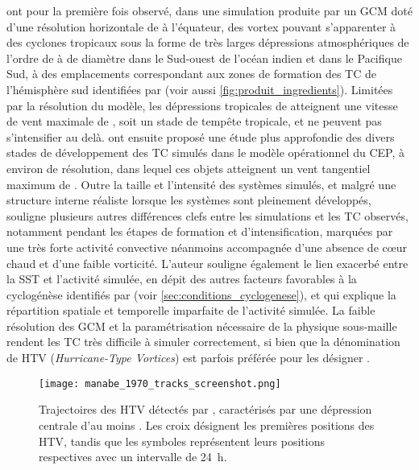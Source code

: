 \documentclass[../main.tex]{subfiles}
\begin{document}
\cite{manabe_tropical_1970} ont pour la première fois observé, dans une simulation produite par un GCM doté d'une résolution horizontale de  à
l'équateur, des vortex pouvant s'apparenter à des cyclones tropicaux sous la forme de très larges dépressions atmosphériques de l'ordre de  à 
de diamètre dans le Sud-ouest de l'océan indien et dans le Pacifique Sud, à des emplacements correspondant aux zones de formation des TC de l'hémisphère sud
identifiées par \cite{gray_global_1968} (voir aussi \cref{fig:produit_ingredients}). Limitées par la résolution du modèle, les dépressions tropicales de
\cite{manabe_tropical_1970} atteignent une vitesse de vent maximale de , soit un stade de tempête tropicale, et ne peuvent pas s'intensifier au delà.
\cite{bengtsson_simulation_1982} ont ensuite proposé une étude plus approfondie des divers stades de développement des TC simulés dans le modèle opérationnel du
CEP, à environ  de résolution, dans lequel ces objets atteignent un vent tangentiel maximum de . Outre la taille et l'intensité des systèmes
simulés, et malgré une structure interne réaliste lorsque les systèmes sont pleinement développés, \cite{mcbride_comments_1984} souligne plusieurs autres
différences clefs entre les simulations et les TC observés, notamment pendant les étapes de formation et d'intensification, marquées par une très forte activité
convective néanmoins accompagnée d'une absence de cœur chaud et d'une faible vorticité. L'auteur souligne également le lien exacerbé entre la SST et l'activité
simulée, en dépit des autres facteurs favorables à la cyclogénèse identifiés par \cite{gray_tropical_1975} (voir \cref{sec:conditions_cyclogenese}), et
qui explique la répartition spatiale et temporelle imparfaite de l'activité simulée. La faible résolution des GCM et la paramétrisation nécessaire de la
physique sous-maille rendent les TC très difficile à simuler correctement, si bien que la dénomination de HTV
(\textit{Hurricane-Type Vortices}) est parfois préférée pour les désigner
\parencite{bengtsson_simulation_1982,bengtsson_hurricanetype_1995,chauvin_response_2006}.

\begin{figure}[htbp]
    \centering
    \texttt{[image: manabe\_1970\_tracks\_screenshot.png]}
    \caption{Trajectoires des HTV détectés par \cite{manabe_tropical_1970}, caractérisés par une dépression centrale d'au moins . Les croix désignent les
        premières positions des HTV, tandis que les symboles représentent leurs positions respectives avec un intervalle de \SI{24}{\hour}.}
    \label{fig:tracks_manabe}
\end{figure}
\end{document}
